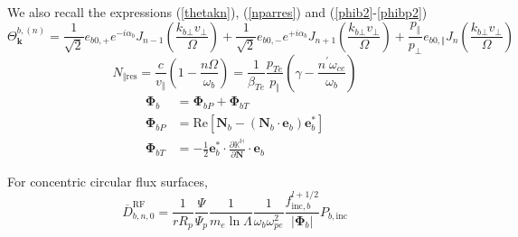 We also recall the expressions (\ref{thetakn}), (\ref{nparres}) and
(\ref{phib2}-\ref{phibp2})%
\begin{equation}
\Theta_{\mathbf{k}}^{b,\left(  n\right)  }=\frac{1}{\sqrt{2}}e_{b0,+}%
e^{-i\alpha_{b}}J_{n-1}\left(  \frac{k_{b\bot}v_{\bot}}{\Omega}\right)
+\frac{1}{\sqrt{2}}e_{b0,-}e^{+i\alpha_{b}}J_{n+1}\left(  \frac{k_{b\bot
}v_{\bot}}{\Omega}\right)  +\frac{p_{\Vert}}{p_{\bot}}e_{b0,\Vert}J_{n}\left(
\frac{k_{b\bot}v_{\bot}}{\Omega}\right)  \label{thetakn2}%
\end{equation}%
\begin{equation}
N_{\Vert\text{res}}=\frac{c}{v_{\Vert}}\left(  1-\frac{n\Omega}{\omega_{b}%
}\right)  =\frac{1}{\beta_{Te}}\frac{p_{Te}}{p_{\Vert}}\left(  \gamma
-\frac{n^{\prime}\omega_{ce}}{\omega_{b}}\right)  \label{nparres2}%
\end{equation}%
\begin{align}
\mathbf{\Phi}_{b}  &  =\mathbf{\Phi}_{bP}+\mathbf{\Phi}_{bT}\label{phib3}\\
\mathbf{\Phi}_{bP}  &  =\text{Re}\left[  \mathbf{N}_{b}-\left(  \mathbf{N}%
_{b}\cdot\mathbf{e}_{b}\right)  \mathbf{e}_{b}^{\ast}\right] \label{phibp3}\\
\mathbf{\Phi}_{bT}  &  =\mathbf{-}\frac{1}{2}\mathbf{e}_{b}^{\ast}\cdot
\frac{\partial\mathbb{{K}^{H}}}{\partial\mathbf{N}}\cdot\mathbf{e}_{b}
\label{phibt3}%
\end{align}

For concentric circular flux surfaces,
\begin{equation}
\overline{D}_{b,n,0}^{\text{RF}}=\frac{1}{rR_{p}}\frac{\Psi}{\Psi_{p}}\frac
{1}{m_{e}\ln\Lambda}\frac{1}{\omega_{b}\omega_{pe}^{2}}\frac{f_{\text{inc}%
,b}^{l+1/2}}{\left|  \mathbf{\Phi}_{b}\right|  }P_{b,\text{inc}}%
\end{equation}
